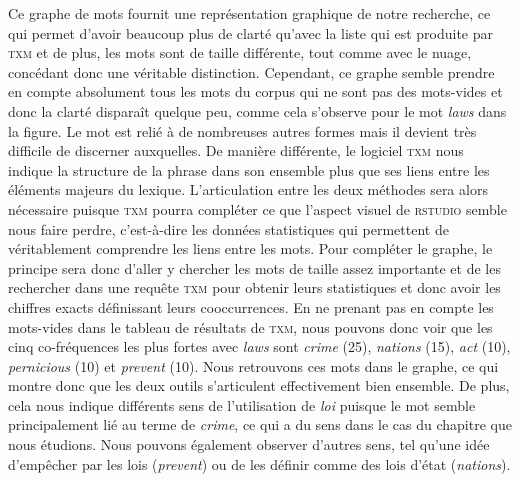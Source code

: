 Ce graphe de mots fournit une représentation graphique de notre recherche, ce qui permet d'avoir beaucoup plus de clarté qu'avec la liste qui est produite par \textsc{txm} et de plus, les mots sont de taille différente, tout comme avec le nuage, concédant donc une véritable distinction. Cependant, ce graphe semble prendre en compte absolument tous les mots du corpus qui ne sont pas des mots-vides et donc la clarté disparaît quelque peu, comme cela s'observe pour le mot \textit{laws} dans la figure. Le mot est relié à de nombreuses autres formes mais il devient très difficile de discerner auxquelles. De manière différente, le logiciel \textsc{txm} nous indique la structure de la phrase dans son ensemble plus que ses liens entre les éléments majeurs du lexique. L'articulation entre les deux méthodes sera alors nécessaire puisque \textsc{txm} pourra compléter ce que l'aspect visuel de \textsc{rstudio} semble nous faire perdre, c'est-à-dire les données statistiques qui permettent de véritablement comprendre les liens entre les mots. Pour compléter le graphe, le principe sera donc d'aller y chercher les mots de taille assez importante et de les rechercher dans une requête \textsc{txm} pour obtenir leurs statistiques et donc avoir les chiffres exacts définissant leurs cooccurrences. En ne prenant pas en compte les mots-vides dans le tableau de résultats de \textsc{txm}, nous pouvons donc voir que les cinq co-fréquences les plus fortes avec \textit{laws} sont \textit{crime} (25), \textit{nations} (15), \textit{act} (10), \textit{pernicious} (10) et \textit{prevent} (10). Nous retrouvons ces mots dans le graphe, ce qui montre donc que les deux outils s'articulent effectivement bien ensemble. De plus, cela nous indique différents sens de l'utilisation de \textit{loi} puisque le mot semble principalement lié au terme de \textit{crime}, ce qui a du sens dans le cas du chapitre que nous étudions. Nous pouvons également observer d'autres sens, tel qu'une idée d'empêcher par les lois (\textit{prevent}) ou de les définir comme des lois d'état (\textit{nations}). \pagebreak

